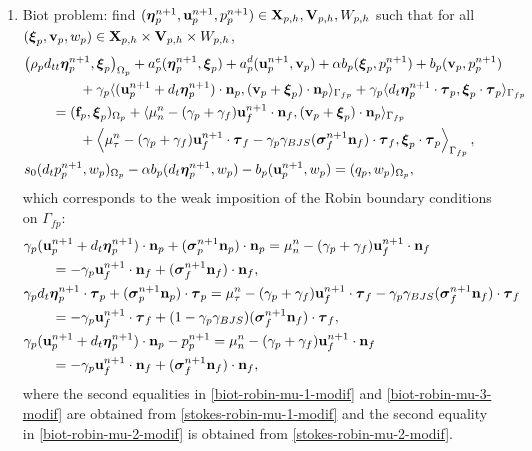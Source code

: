 \documentclass[11pt]{article}
\def\u{{\bf u}}
\def\bv{{\bf v}}
\def\n{{\bf n}}
\def\f{{\bf f}}
\def\btau{\boldsymbol{\tau}}
\def\bbeta{\boldsymbol{\eta}}
\def\bs{\boldsymbol{\sigma}}
\def\bxi{\boldsymbol{\xi}}
\def\V{{\bf V}}
\def\X{{\bf X}}
\def\O{\Omega}
\def\<{\langle}
\def\>{\rangle}
\def\dt{d_t}
\def\dtt{d_{tt}}
\begin{document}
\begin{enumerate}
\item Biot problem: find $(\bbeta_{p}^{n+1},\u_p^{n+1},p_{p}^{n+1}) \in \X_{p,h},\V_{p,h},W_{p,h}$ such that for all
$(\bxi_p,\bv_p,w_p) \in \X_{p,h}\times\V_{p,h}\times W_{p,h}$,
%
\begin{align}
  &\big(\rho_p\dtt\bbeta_{p}^{n+1},\bxi_{p}\big)_{\O_p}
  + a^e_{p}(\bbeta_{p}^{n+1},\bxi_{p})
  + a^d_{p}(\u_{p}^{n+1},\bv_{p})
  + \alpha b_p(\bxi_{p},p_{p}^{n+1})
  + b_p(\bv_{p},p_{p}^{n+1})
  \nonumber \\
  & \qquad\qquad  + \gamma_p\<(\u_p^{n+1} + \dt\bbeta_p^{n+1})\cdot\n_p,
        (\bv_p + \bxi_p)\cdot\n_p\>_{\Gamma_{fp}}
  + \gamma_p\<\dt\bbeta_p^{n+1}\cdot\btau_p,\bxi_p\cdot\btau_p\>_{\Gamma_{fp}}
  \nonumber \\
  & \qquad = (\f_{p},\bxi_{p})_{\O_p}
  + \<\mu_n^n - (\gamma_p + \gamma_f)\u_f^{n+1}\cdot\n_f,
  (\bv_p + \bxi_p)\cdot\n_p\>_{\Gamma_{fp}} \nonumber \\
  & \qquad\qquad + \left\<\mu_{\tau}^n
- (\gamma_p + \gamma_f)\u_f^{n+1}\cdot\btau_f -\gamma_p\gamma_{BJS}(\bs_f^{n+1}\n_f)\cdot\btau_{f},
\bxi_p\cdot\btau_p\right\>_{\Gamma_{fp}}, \label{biot-weak-1} \\
& s_0(\dt p_{p}^{n+1},w_{p})_{\O_p} - \alpha b_p(\dt\bbeta_{p}^{n+1},w_{p}) - b_p(\u_{p}^{n+1},w_{p}) = (q_{p},w_{p})_{\O_p}, \label{biot-weak-2}
\end{align}
%
which corresponds to the weak imposition of the Robin boundary conditions on $\Gamma_{fp}$:
%
\begin{subequations}\label{biot-robin-mu-modif}
\begin{align}
  & \gamma_p(\u_p^{n+1} + \dt\bbeta_p^{n+1})\cdot\n_p + (\bs_p^{n+1} \n_p)\cdot\n_p
   = \mu_n^n - (\gamma_p + \gamma_f)\u_f^{n+1}\cdot\n_f
  \nonumber \\
  & \qquad = - \gamma_p \u_f^{n+1}\cdot\n_f + (\bs_f^{n+1} \n_f)\cdot\n_f,
  \label{biot-robin-mu-1-modif}\\
& \gamma_p \dt \bbeta_p^{n+1}\cdot\btau_{p} + (\bs_p^{n+1}\n_p)\cdot\btau_{p}
= \mu_{\tau}^n
- (\gamma_p + \gamma_f)\u_f^{n+1}\cdot\btau_f -\gamma_p \gamma_{BJS}(\bs_f^{n+1}\n_f)\cdot\btau_{f}
\nonumber \\
& \qquad = - \gamma_p \u_f^{n+1}\cdot\btau_{f}+(1- \gamma_p\gamma_{BJS})(\bs_f^{n+1}\n_f)\cdot\btau_{f},
\label{biot-robin-mu-2-modif}\\
& \gamma_p (\u_p^{n+1} + \dt\bbeta_p^{n+1})\cdot\n_p - p_p^{n+1}
 = \mu_n^n - (\gamma_p + \gamma_f)\u_f^{n+1}\cdot\n_f
\nonumber \\
& \qquad = -\gamma_p \u_f^{n+1}\cdot\n_f + (\bs_f^{n+1} \n_f)\cdot\n_f,
\label{biot-robin-mu-3-modif}
\end{align}
\end{subequations}
%
  where the second equalities in \eqref{biot-robin-mu-1-modif} and \eqref{biot-robin-mu-3-modif} 
  are obtained from \eqref{stokes-robin-mu-1-modif} and the second equality in \eqref{biot-robin-mu-2-modif} is obtained from \eqref{stokes-robin-mu-2-modif}.


\end{enumerate}
\end{document}
